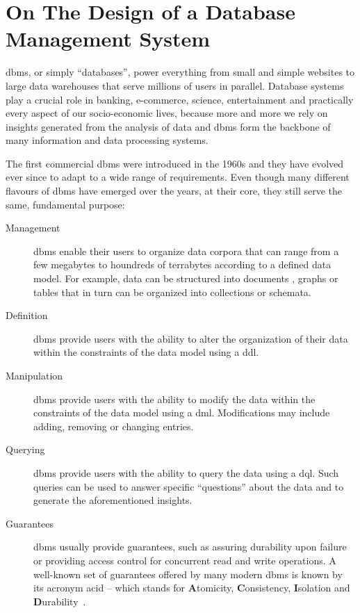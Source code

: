 \chapter{On The Design of a Database Management System}
\label{chapter:theory_databases}


\acrfull{dbms}, or simply ``databases'', power everything from small and simple websites to large data warehouses that serve millions of users in parallel. Database systems play a crucial role in banking, e-commerce, science, entertainment and practically every aspect of our socio-economic lives, because more and more we rely on insights generated from the analysis of data \cite{Dhar:2013Data} and \acrshort{dbms} form the backbone of many information and data processing systems.

The first commercial \acrshort{dbms} were introduced in the 1960s \cite{Garcia:2009Database} and they have evolved ever since to adapt to a wide range of requirements. Even though many different flavours of \gls{dbms} have emerged over the years, at their core, they still serve the same, fundamental purpose:

\begin{description}
    \item[Management] \acrshort{dbms} enable their users to organize data corpora that can range from a few megabytes to houndreds of terrabytes according to a defined data model. For example, data can be structured into documents \cite{Hashem:2016Evaluating}, graphs \cite{Angles:2008Survey} or tables that in turn can be organized into collections or schemata.
    \item[Definition] \acrshort{dbms} provide users with the ability to alter the organization of their data within the constraints of the data model using a \acrfull{ddl}. 
    \item[Manipulation] \acrshort{dbms} provide users with the ability to modify the data within the constraints of the data model using a \acrfull{dml}. Modifications may include adding, removing or changing entries.
    \item[Querying] \acrshort{dbms} provide users with the ability to query the data using a \acrfull{dql}. Such queries can be used to answer specific ``questions'' about the data and to generate the aforementioned insights.
    \item[Guarantees] \acrshort{dbms} usually provide guarantees, such as assuring durability upon failure or providing access control for concurrent read and write operations. A well-known set of guarantees offered by many modern \acrshort{dbms} is known by its acronym \acrshort{acid} -- which stands for \textbf{A}tomicity, \textbf{C}onsistency, \textbf{I}solation and \textbf{D}urability~\cite{Haerder:1983principles}.
\end{description}

